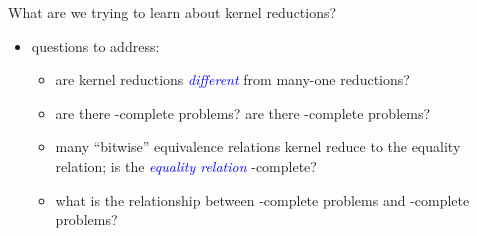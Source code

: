 \documentclass[final]{beamer}
\newcommand{\emphblue}[1]{\emph{\textcolor{blue}{#1}}}
\begin{document}
\begin{frame}{}
\begin{columns}[t]
\begin{column}{.3\linewidth}
      \vspace{1.7in}

      \begin{block}{\LARGE What are we trying to learn about kernel
          reductions?}
        \begin{itemize}\Large
        \item questions to address:
          \begin{itemize}\Large
          \item are kernel reductions \emphblue{different} from many-one
            reductions?
          \item are there \PEq-complete problems? are there \NPEq-complete
            problems?
          \item many ``bitwise'' equivalence relations kernel reduce to the
            equality relation; is the \emphblue{equality relation}
            \PEq-complete?
          \item what is the relationship between \NP-complete problems and
            \NPEq-complete problems?
          \end{itemize}
        \end{itemize}
      \end{block}

    \end{column}

  \end{columns}
\end{frame}
\end{document}
